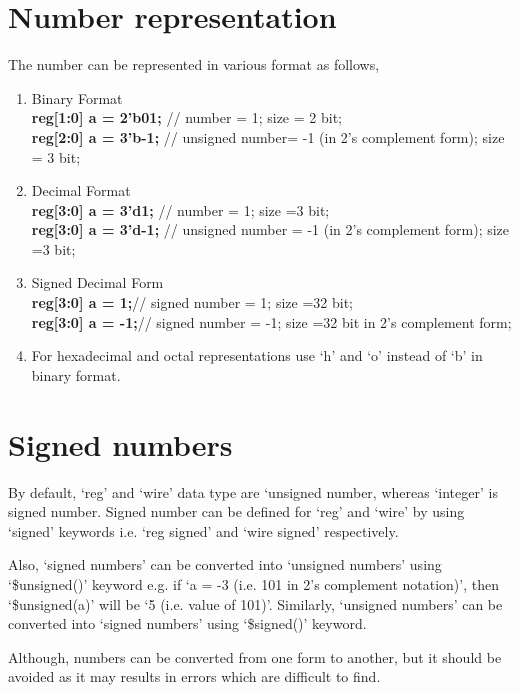 \section{Number representation}
The number can be represented in various format as follows, 
\begin{enumerate}
	\item {Binary Format} \\
	\textbf{reg[1:0] a = 2'b01;} //  number =  1; size = 2 bit;	\\	
	\textbf{reg[2:0] a = 3'b-1;}  // unsigned number= -1 (in 2's complement form); size = 3 bit;\\
	\item {Decimal Format} \\
	\textbf{reg[3:0] a = 3'd1;}   // number = 1; size =3 bit; \\	
	\textbf{reg[3:0] a = 3'd-1;} // unsigned number = -1 (in 2's complement form); size =3 bit;\\
	\item {Signed Decimal Form}\\
	\textbf{reg[3:0] a = 1;}// signed number = 1; size =32 bit; \\
	\textbf{reg[3:0] a = -1;}// signed number = -1; size =32 bit in 2's complement form; \\
	
	\item For hexadecimal and octal representations use `h' and `o' instead of `b' in binary format.  
\end{enumerate}

\section{Signed numbers}
By default, `reg' and `wire' data type are `unsigned number, whereas `integer' is signed number. Signed number can be defined for `reg' and `wire' by using `signed' keywords i.e. `reg signed' and `wire signed' respectively. 

Also, `signed numbers' can be converted into `unsigned numbers' using `\$unsigned()' keyword e.g. if `a = -3 (i.e. 101 in 2's complement notation)', then `\$unsigned(a)' will be `5 (i.e. value of 101)'. Similarly,  `unsigned numbers' can be converted into `signed numbers' using `\$signed()' keyword. 

\begin{noNumBox}
	Although, numbers can be converted from one form to another, but it should be avoided as it may results in errors which are difficult to find. 
\end{noNumBox}


